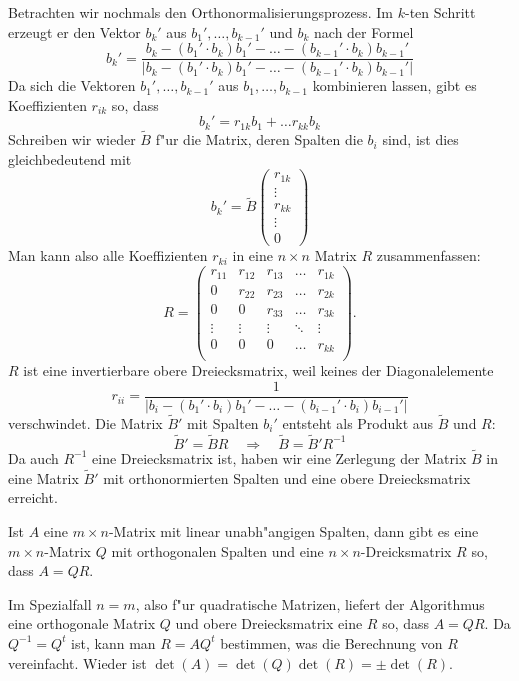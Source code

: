 Betrachten wir nochmals den Orthonormalisierungsprozess. Im $k$-ten
Schritt erzeugt er den Vektor $b_k'$ aus $b_1',\dots,b_{k-1}'$
und $b_k$ nach der Formel
\[
b_k'=\frac{
b_k-(b_1'\cdot b_k)b_1'-\dots-(b_{k-1}'\cdot b_k)b_{k-1}'
}{|
b_k-(b_1'\cdot b_k)b_1'-\dots-(b_{k-1}'\cdot b_k)b_{k-1}'
|}
\]
Da sich die Vektoren $b_1',\dots,b_{k-1}'$ aus 
$b_1,\dots,b_{k-1}$ kombinieren lassen, gibt es Koeffizienten $r_{ik}$
so, dass
\[
b_k'=r_{1k}b_1+\dots r_{kk}b_k
\]
Schreiben wir wieder $\tilde B$ f"ur die Matrix, deren Spalten die
$b_i$ sind, ist dies gleichbedeutend mit
\[
b_k'=\tilde B\begin{pmatrix}r_{1k}\\\vdots\\r_{kk}\\\vdots\\0\end{pmatrix}
\]
Man kann also alle Koeffizienten $r_{ki}$ in eine $n\times n$ Matrix $R$
zusammenfassen:
\[
R=\begin{pmatrix}
r_{11}&r_{12}&r_{13}&\dots &r_{1k}\\
0     &r_{22}&r_{23}&\dots &r_{2k}\\
0     &0     &r_{33}&\dots &r_{3k}\\
\vdots&\vdots&\vdots&\ddots&\vdots\\
0     &0     &0     &\dots &r_{kk}\\
\end{pmatrix}.
\]
$R$ ist eine invertierbare
obere Dreiecksmatrix, weil keines der
Diagonalelemente
\[
r_{ii}=\frac1{|
b_i-(b_1'\cdot b_i)b_1'-\dots-(b_{i-1}'\cdot b_i)b_{i-1}'
|}
\]
verschwindet.
Die Matrix $\tilde B'$ mit Spalten $b_i'$ entsteht als Produkt aus $\tilde B$
und $R$:
\[
\tilde B'=\tilde BR
\quad\Rightarrow\quad
\tilde B=\tilde B'R^{-1}
\]
Da auch $R^{-1}$ eine Dreiecksmatrix ist, haben wir eine Zerlegung der
Matrix $\tilde B$ in eine Matrix $\tilde B'$ mit orthonormierten
Spalten und eine obere Dreiecksmatrix erreicht.

\begin{satz}[QR-Zerlegung]
Ist $A$ eine $m\times n$-Matrix mit linear unabh"angigen Spalten,
dann gibt es eine $m\times n$-Matrix $Q$ mit orthogonalen Spalten
und eine $n\times n$-Dreicksmatrix $R$ so, dass $A=QR$.
\end{satz}

Im Spezialfall $n=m$, also f"ur quadratische Matrizen, liefert der
Algorithmus eine orthogonale Matrix $Q$ und obere Dreiecksmatrix eine $R$
so, dass $A=QR$. Da $Q^{-1}=Q^t$ ist, kann man $R=AQ^t$ bestimmen,
was die Berechnung von $R$ vereinfacht.
Wieder ist $\det(A)=\det(Q)\det(R)=\pm\det(R)$.

